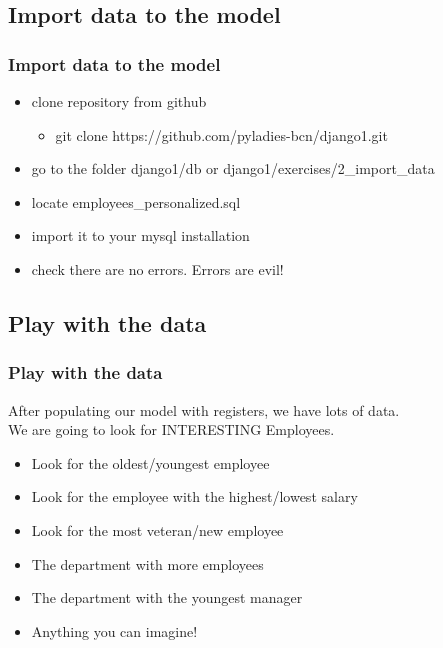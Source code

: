 	\subsection{Import data to the model}
	\begin{frame}
		\frametitle{Import data to the model}
		\begin{itemize}[<+->]
			\item clone repository from github
			\begin{itemize}
				\item git clone https://github.com/pyladies-bcn/django1.git
			\end{itemize}
			\item go to the folder django1/db or django1/exercises/2_import_data
			\item locate employees_personalized.sql
			\item import it to your mysql installation
			\item check there are no errors. Errors are evil!
		\end{itemize}
	\end{frame}

	\subsection{Play with the data}
	\begin{frame}
		\frametitle{Play with the data}
		After populating our model with registers, we have lots of data. \\ \pause
		We are going to look for  INTERESTING  Employees.
		\begin{itemize}[<+->]
			\item Look for the oldest/youngest employee
			\item Look for the employee with the highest/lowest salary
			\item Look for the most veteran/new employee
			\item The department with more employees
			\item The department with the youngest manager
			\item Anything you can imagine!
		\end{itemize}
	\end{frame}

\ThankYouFrame


